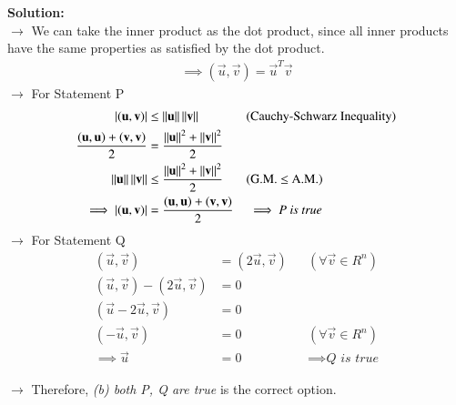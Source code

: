 \documentclass[journal]{IEEEtran}
\begin{document}
\textbf{Solution:}\\
$\rightarrow$ We can take the inner product as the dot product, since all inner products have the same properties as satisfied by the dot product.
\begin{align}
    \implies (\vec{u}, \vec{v}) = \vec{u}^T\vec{v}
\end{align}
$\rightarrow$ For Statement P
\begin{align}
    |(\mathbf{u}, \mathbf{v})| &\leq \left\lVert\mathbf{u}\right\rVert\left\lVert\mathbf{v}\right\rVert && \text{(Cauchy-Schwarz Inequality)} \\
    \frac{(\mathbf{u}, \mathbf{u}) + (\mathbf{v}, \mathbf{v})}{2} &= \frac{\left\lVert\mathbf{u}\right\rVert^2 + \left\lVert\mathbf{v}\right\rVert^2}{2} \\
    \left\lVert\mathbf{u}\right\rVert\left\lVert\mathbf{v}\right\rVert &\leq \frac{\left\lVert\mathbf{u}\right\rVert^2 + \left\lVert\mathbf{v}\right\rVert^2}{2} && \text{(G.M. $\leq$ A.M.)} \\
    \implies |(\mathbf{u}, \mathbf{v})| &= \frac{(\mathbf{u}, \mathbf{u})+(\mathbf{v}, \mathbf{v})}{2} && \implies \textit{P is true}
\end{align}
$\rightarrow$ For Statement Q
\begin{align}
    (\vec{u}, \vec{v}) &= (2\vec{u}, \vec{v}) && (\forall \vec{v} \in R^n) \\
    (\vec{u}, \vec{v}) - (2\vec{u}, \vec{v}) &= 0 \\
    (\vec{u} - 2\vec{u}, \vec{v}) &= 0 \\
    (-\vec{u}, \vec{v}) &= 0 && (\forall \vec{v} \in R^n) \\
    \implies \vec{u} &= 0 && \implies \textit{Q is true}
\end{align}

$\longrightarrow$ Therefore, \textit{(b) both P, Q are true} is the correct option.
\end{document}
